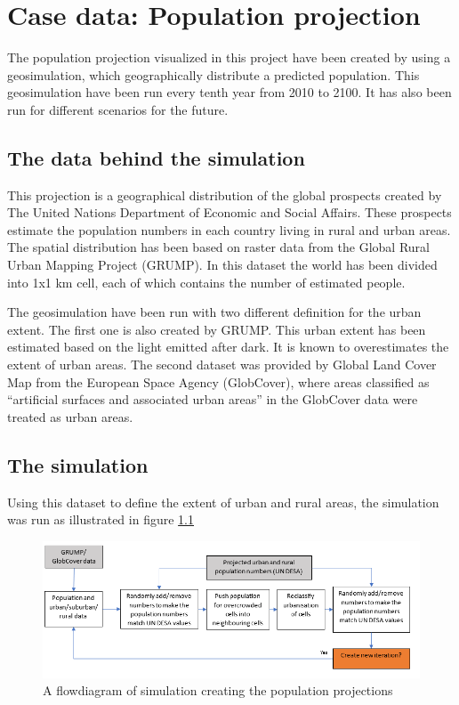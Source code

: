 \chapter{Case data: Population projection}\label{CCaseData}
The population projection visualized in this project have been created by \citet{Kessler} using a geosimulation, which geographically distribute a predicted population. This geosimulation have been run every tenth year from 2010 to 2100. It has also been run for different scenarios for the future.

\section{The data behind the simulation}\label{TheDataBehind}
This projection is a geographical distribution of the global prospects created by The United Nations Department of Economic and Social Affairs. These prospects estimate the population numbers in each country living in rural and urban areas. The spatial distribution has been based on raster data from the Global Rural Urban Mapping Project (GRUMP). In this dataset the world has been divided into 1x1 km cell, each of which contains the number of estimated people. \citep{Kessler}

The geosimulation have been run with two different definition for the urban extent. The first one is also created by GRUMP. This urban extent has been estimated based on the light emitted after dark. It is known to overestimates the extent of urban areas. \citep{Kessler}
The second dataset was provided by Global Land Cover Map from the European Space Agency (GlobCover), where areas classified as “artificial surfaces and associated urban areas” in the GlobCover data were treated as urban areas. 

\section{The simulation}
Using this dataset to define the extent of urban and rural areas, the simulation was run as illustrated in figure \ref{CreatingData}

\begin{figure} [H]
	\centering
	\includegraphics[width=1\textwidth]{Pictures/CreatingData}
	\caption{A flowdiagram of simulation creating the population projections}
	\label{CreatingData}
\end{figure}


